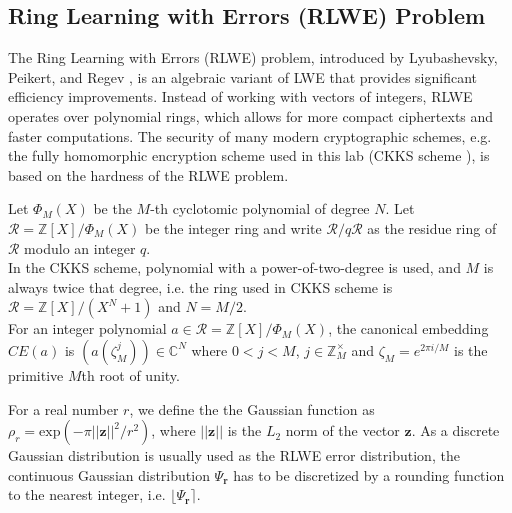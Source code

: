     \subsection{Ring Learning with Errors (RLWE) Problem} 
    The Ring Learning with Errors (RLWE) problem, introduced by Lyubashevsky, Peikert, and Regev \cite{idealLatticeRLWE}, is an algebraic variant of LWE that provides significant efficiency improvements. Instead of working with vectors of integers, RLWE operates over polynomial rings, which allows for more compact ciphertexts and faster computations. The security of many modern cryptographic schemes, e.g. the fully homomorphic encryption scheme used in this lab (CKKS scheme \cite{cheon2017homomorphic}), is based on the hardness of the RLWE problem.
    \begin{definition}
    Let $\Phi_M(X)$ be the $M$-th cyclotomic polynomial of degree $N$. Let $\mathcal{R} = \mathbb{Z}[X]/\Phi_M(X)$ be the integer ring and write $\mathcal{R}/q \mathcal{R}$ as the residue ring of $\mathcal{R}$ modulo an integer $q$.\\
    In the CKKS scheme, polynomial with a power-of-two-degree is used, and $M$ is always twice that degree, i.e. the ring used in CKKS scheme is $\mathcal{R} = \mathbb{Z}[X]/(X^N + 1)$ and $N = M/2$.\\
    For an integer polynomial $a \in \mathcal{R} = \mathbb{Z}[X]/\Phi_M(X)$, the canonical embedding $CE(a)$ is $(a(\zeta_{M}^j)) \in \mathbb{C}^N$ where $0 < j < M$, $j \in \mathbb{Z}_M^\times$ and $\zeta_M = e^{2\pi i / M}$ is the primitive $M$th root of unity.
    \end{definition}
    
    \begin{definition}
    For a real number $r$, we define the the Gaussian function as $\rho _r = \text{exp}(-\pi ||\mathbf{z}||^2 /r^2)$, where $||\mathbf{z}||$ is the $L_{2}$ norm of the vector $\mathbf{z}$.
    As a discrete Gaussian distribution is usually used as the RLWE error distribution, the continuous Gaussian distribution $\Psi_\mathbf{r}$ has to be discretized by a rounding function to the nearest integer, i.e. $\lfloor \Psi_\mathbf{r} \rceil$.
    \end{definition}

